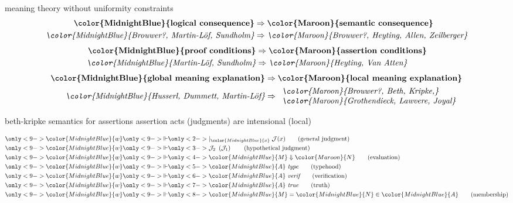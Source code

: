 \documentclass[10pt]{beamer}
\def\InputModeColorName{MidnightBlue}
\def\OutputModeColorName{Maroon}
\newcommand\IMode[1]{{\color{\InputModeColorName}{#1}}}
\newcommand\OMode[1]{{\color{\OutputModeColorName}{#1}}}
\newcommand\GenJ[2]{%
  \vert_{\IMode{#1}}\; #2
}
\newcommand\HypJ[2]{%
  #1\ \left(#2\right)
}
\newcommand\Eval[2]{\IMode{#1}\Downarrow\OMode{#2}}
\newcommand\EqMember[3]{\IMode{#1}=\IMode{#2}\in\IMode{#3}}
\newcommand\IsType[1]{\IMode{#1}\ \textit{type}}
\newcommand\IsTrue[1]{\IMode{#1}\ \text{\rmfamily\itshape true}}
\newcommand\IsVer[1]{\IMode{#1}\ \text{\rmfamily\itshape verif}}
\begin{document}
\begin{frame}{meaning theory without uniformity constraints}
  \pause
  \begin{align*}
    \textbf{\IMode{logical consequence}} &\Rightarrow \textbf{\OMode{semantic consequence}}\\
    \textit{\IMode{Brouwer?, Martin-L\"of, Sundholm}} &\Rightarrow \textit{\OMode{Brouwer?, Heyting, Allen, Zeilberger}}
  \end{align*}
  \pause
  \begin{align*}
    \textbf{\IMode{proof conditions}} &\Rightarrow \textbf{\OMode{assertion conditions}}\\
    \textit{\IMode{Martin-L\"of, Sundholm}} &\Rightarrow \textit{\OMode{Heyting, Van Atten}}
  \end{align*}
  \pause
  \begin{align*}
    \textbf{\IMode{global meaning explanation}} &\Rightarrow \textbf{\OMode{local meaning explanation}}\\
    \textit{\IMode{Husserl, Dummett, Martin-L\"of}} &\Rightarrow
      \begin{array}{l}
        \textit{\OMode{Brouwer?, Beth, Kripke,}}\\
        \textit{\OMode{Grothendieck, Lawvere, Joyal}}
      \end{array}
  \end{align*}
\end{frame}

\begin{frame}{beth-kripke semantics for assertions}
  assertion acts (judgments) are intensional (local)
  \pause

  \begin{align*}
    \only<9->{\IMode{w}}&\only<9->{\Vdash}\only<2->{\GenJ{x}{\mathcal{J}(x)}\tag{general judgment}}\\
    \only<9->{\IMode{w}}&\only<9->{\Vdash}\only<3->{\HypJ{\mathcal{J}_2}{\mathcal{J}_1}\tag{hypothetical judgment}}\\
    \only<9->{\IMode{w}}&\only<9->{\Vdash}\only<4->{\Eval{M}{N}\tag{evaluation}}\\
    \only<9->{\IMode{w}}&\only<9->{\Vdash}\only<5->{\IsType{A}\tag{typehood}}\\
    \only<9->{\IMode{w}}&\only<9->{\Vdash}\only<6->{\IsVer{A}\tag{verification}}\\
    \only<9->{\IMode{w}}&\only<9->{\Vdash}\only<7->{\IsTrue{A}\tag{truth}}\\
    \only<9->{\IMode{w}}&\only<9->{\Vdash}\only<8->{\EqMember{M}{N}{A}\tag{membership}}
  \end{align*}
\end{frame}
\end{document}
